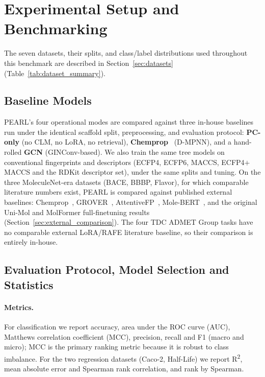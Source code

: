 \documentclass[pdflatex,sn-basic]{sn-jnl}%
\begin{document}
\section{Experimental Setup and Benchmarking}\label{sec:experimental_setup}
The seven datasets, their splits, and class/label distributions used throughout this benchmark are described in Section~\ref{sec:datasets} (Table~\ref{tab:dataset_summary}).

\subsection{Baseline Models}\label{sec:baselines}
PEARL's four operational modes are compared against three in-house baselines run under the identical scaffold split, preprocessing, and evaluation protocol: \textbf{PC-only} (no CLM, no LoRA, no retrieval), \textbf{Chemprop}~\cite{yang2019chemprop} (D-MPNN), and a hand-rolled \textbf{GCN} (GINConv-based). We also train the same tree models on conventional fingerprints and descriptors (ECFP4, ECFP6, MACCS, ECFP4$+$MACCS and the RDKit descriptor set), under the same splits and tuning. On the three MoleculeNet-era datasets (BACE, BBBP, Flavor), for which comparable literature numbers exist, PEARL is compared against published external baselines: Chemprop~\cite{yang2019chemprop}, GROVER~\cite{rong2020grover}, AttentiveFP~\cite{xiong2020attentivefp}, Mole-BERT~\cite{xia2023molecbert}, and the original Uni-Mol and MolFormer full-finetuning results (Section~\ref{sec:external_comparison}). The four TDC ADMET Group tasks have no comparable external LoRA/RAFE literature baseline, so their comparison is entirely in-house.

\subsection{Evaluation Protocol, Model Selection and Statistics}\label{sec:eval_protocol}
\paragraph{Metrics.} For classification we report accuracy, area under the ROC curve (AUC), Matthews correlation coefficient (MCC), precision, recall and F1 (macro and micro); MCC is the primary ranking metric because it is robust to class imbalance. For the two regression datasets (Caco-2, Half-Life) we report R\textsuperscript{2}, mean absolute error and Spearman rank correlation, and rank by Spearman.
\end{document}

